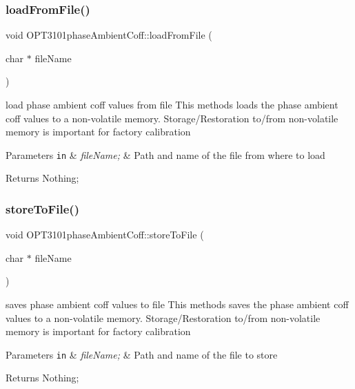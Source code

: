 \subsubsection{\texorpdfstring{load\+From\+File()}{loadFromFile()}}
{\footnotesize\ttfamily void O\+P\+T3101phase\+Ambient\+Coff\+::load\+From\+File (\begin{DoxyParamCaption}\item[{char $\ast$}]{file\+Name }\end{DoxyParamCaption})}



load phase ambient coff values from file This methods loads the phase ambient coff values to a non-\/volatile memory. Storage/\+Restoration to/from non-\/volatile memory is important for factory calibration 


\begin{DoxyParams}[1]{Parameters}
\mbox{\tt in}  & {\em file\+Name;} & Path and name of the file from where to load \\
\hline
\end{DoxyParams}
\begin{DoxyReturn}{Returns}
Nothing; 
\end{DoxyReturn}
\mbox{\label{class_o_p_t3101phase_ambient_coff_aa7ff470b91c005c7e6c589f70ad5f5b8}} 
\subsubsection{\texorpdfstring{store\+To\+File()}{storeToFile()}}
{\footnotesize\ttfamily void O\+P\+T3101phase\+Ambient\+Coff\+::store\+To\+File (\begin{DoxyParamCaption}\item[{char $\ast$}]{file\+Name }\end{DoxyParamCaption})}



saves phase ambient coff values to file This methods saves the phase ambient coff values to a non-\/volatile memory. Storage/\+Restoration to/from non-\/volatile memory is important for factory calibration 


\begin{DoxyParams}[1]{Parameters}
\mbox{\tt in}  & {\em file\+Name;} & Path and name of the file to store \\
\hline
\end{DoxyParams}
\begin{DoxyReturn}{Returns}
Nothing; 
\end{DoxyReturn}


